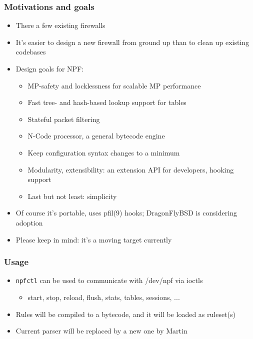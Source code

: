 \documentclass[magyar]{beamer}
\begin{document}
\begin{frame}
\frametitle{Motivations and goals}
\begin{itemize}
	\item There a few existing firewalls
	\item It's easier to design a new firewall from ground up than to clean up existing codebases
	\item Design goals for NPF:
	\begin{itemize}
		\item MP-safety and locklessness for scalable MP performance
		\item Fast tree- and hash-based lookup support for tables
		\item Stateful packet filtering
		\item N-Code processor, a general bytecode engine
		\item Keep configuration syntax changes to a minimum
		\item Modularity, extensibility: an extension API for developers, hooking support
		\item Last but not least: simplicity
	\end{itemize}
	\item Of course it's portable, uses pfil(9) hooks; DragonFlyBSD is considering adoption 
	\item Please keep in mind: it's a moving target currently
\end{itemize}
\end{frame}

\begin{frame}
\frametitle{Usage}
\begin{itemize}
	\item \texttt{npfctl} can be used to communicate with /dev/npf via ioctls
		\begin{itemize}
			\item start, stop, reload, flush, stats, tables, sessions, ...
		\end{itemize}
	\item Rules will be compiled to a bytecode, and it will be loaded as ruleset(s)
	\item Current parser will be replaced by a new one by Martin
\end{itemize}
\end{frame}
\end{document}
